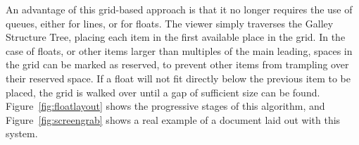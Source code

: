 An advantage of this grid-based approach is that it no longer requires the use of queues, either for lines, or for floats. The viewer simply traverses the Galley Structure Tree, placing each item in the first available place in the grid. In the case of floats, or other items larger than multiples of the main \gls{leading}, spaces in the grid can be marked as reserved, to prevent other items from trampling over their reserved space. If a float will not fit directly below the previous item to be placed, the grid is walked over until a gap of sufficient size can be found. Figure~\ref{fig:floatlayout} shows the progressive stages of this algorithm, and Figure~\ref{fig:screengrab} shows a real example of a document laid out with this system.

\begin{figure}
    \captionsetup[subfigure]{justification=raggedright}
    \hspace{0.04\textwidth}
    \hspace{0.04\textwidth}
    \\

\end{figure}
